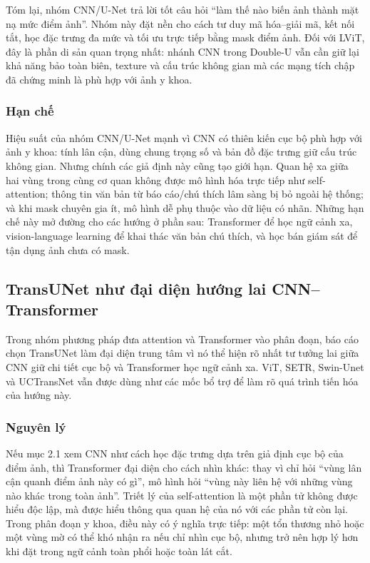 Tóm lại, nhóm CNN/U-Net trả lời tốt câu hỏi ``làm thế nào biến ảnh thành mặt nạ mức điểm ảnh''. Nhóm này đặt nền cho cách tư duy mã hóa--giải mã, kết nối tắt, học đặc trưng đa mức và tối ưu trực tiếp bằng mask điểm ảnh. Đối với LViT, đây là phần di sản quan trọng nhất: nhánh CNN trong Double-U vẫn cần giữ lại khả năng bảo toàn biên, texture và cấu trúc không gian mà các mạng tích chập đã chứng minh là phù hợp với ảnh y khoa.

\subsubsection{Hạn chế}

Hiệu suất của nhóm CNN/U-Net mạnh vì CNN có thiên kiến cục bộ phù hợp với ảnh y khoa: tính lân cận, dùng chung trọng số và bản đồ đặc trưng giữ cấu trúc không gian. Nhưng chính các giả định này cũng tạo giới hạn. Quan hệ xa giữa hai vùng trong cùng cơ quan không được mô hình hóa trực tiếp như self-attention; thông tin văn bản từ báo cáo/chú thích lâm sàng bị bỏ ngoài hệ thống; và khi mask chuyên gia ít, mô hình dễ phụ thuộc vào dữ liệu có nhãn. Những hạn chế này mở đường cho các hướng ở phần sau: Transformer để học ngữ cảnh xa, vision-language learning để khai thác văn bản chú thích, và học bán giám sát để tận dụng ảnh chưa có mask.

\subsection{TransUNet như đại diện hướng lai CNN--Transformer}

Trong nhóm phương pháp đưa attention và Transformer vào phân đoạn, báo cáo chọn TransUNet làm đại diện trung tâm vì nó thể hiện rõ nhất tư tưởng lai giữa CNN giữ chi tiết cục bộ và Transformer học ngữ cảnh xa. ViT, SETR, Swin-Unet và UCTransNet vẫn được dùng như các mốc bổ trợ để làm rõ quá trình tiến hóa của hướng này.

\subsubsection{Nguyên lý}

Nếu mục 2.1 xem CNN như cách học đặc trưng dựa trên giả định cục bộ của điểm ảnh, thì Transformer đại diện cho cách nhìn khác: thay vì chỉ hỏi ``vùng lân cận quanh điểm ảnh này có gì'', mô hình hỏi ``vùng này liên hệ với những vùng nào khác trong toàn ảnh''. Triết lý của self-attention là một phần tử không được hiểu độc lập, mà được hiểu thông qua quan hệ của nó với các phần tử còn lại. Trong phân đoạn y khoa, điều này có ý nghĩa trực tiếp: một tổn thương nhỏ hoặc một vùng mờ có thể khó nhận ra nếu chỉ nhìn cục bộ, nhưng trở nên hợp lý hơn khi đặt trong ngữ cảnh toàn phổi hoặc toàn lát cắt.

